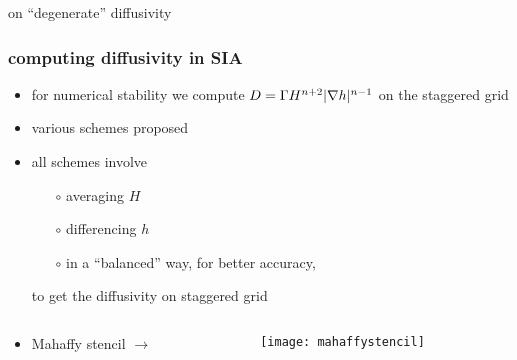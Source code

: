 \begin{frame}{on ``degenerate'' diffusivity}

\end{frame}


\begin{frame}
  \frametitle{computing diffusivity in SIA}

\begin{itemize}
\item for numerical stability we compute $D = \Gamma H^{n+2} |\nabla h|^{n-1}$ on the staggered grid
\item various schemes proposed
\item all schemes involve
  \begin{itemize}
  \item[$\circ$] averaging $H$
  \item[$\circ$] differencing $h$
  \item[$\circ$] in a ``balanced'' way, for better accuracy,
  \end{itemize}
to get the diffusivity on staggered grid
\end{itemize}

\begin{columns}
\begin{column}{0.65\textwidth}
\begin{itemize}
\item Mahaffy stencil \large $\to$ \normalsize
\end{itemize}
\end{column}

\begin{column}{0.35\textwidth}
  \texttt{[image: mahaffystencil]}
\end{column}
\end{columns}
\end{frame}


